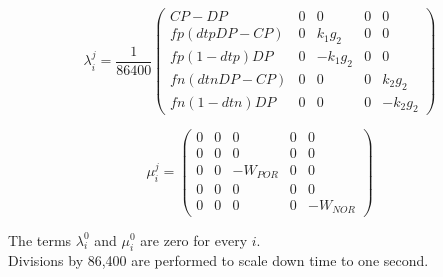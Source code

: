 \begin{equation}
\lambda_i^j = \frac{1}{86400}
\left(
  \begin{array}{ccccc}
    CP-DP & 0 & 0 & 0 & 0 \\ %
    fp (dtp DP -CP) & 0 &  k_1 g_2 & 0 & 0 \\ %
    fp (1-dtp) DP   & 0 & -k_1 g_2 & 0 & 0 \\ %
    fn (dtn DP -CP) & 0 &        0 & 0 &  k_2 g_2 \\ %
    fn (1-dtn) DP   & 0 &        0 & 0 & -k_2 g_2
  \end{array}
\right)
\end{equation}

$$
  \mu_i^j = 
  \begin{pmatrix}
   0 & 0 & 0 & 0 &  0 \\
   0 & 0 & 0 & 0 &  0 \\
   0 & 0 & -W_{POR} & 0 & 0 \\
   0 & 0 & 0 & 0 &  0 \\
   0 & 0 & 0 & 0 & -W_{NOR}
  \end{pmatrix}
$$  

The terms $\lambda_i^0$ and $\mu_i^0$ are zero for every $i$.\\

Divisions by 86,400 are performed to scale down time to one second.
